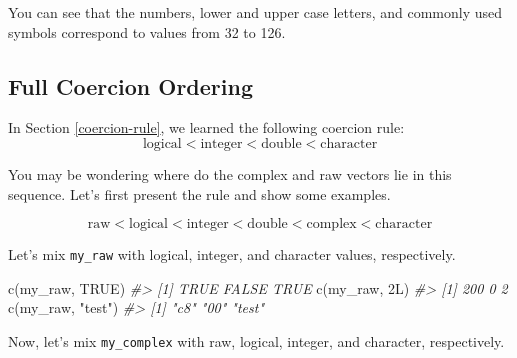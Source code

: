 \documentclass[
]{book}
\newenvironment{Shaded}{\begin{snugshade}}{\end{snugshade}}
\newcommand{\CommentTok}[1]{\textcolor[rgb]{0.56,0.35,0.01}{\textit{#1}}}
\newcommand{\ConstantTok}[1]{\textcolor[rgb]{0.00,0.00,0.00}{#1}}
\newcommand{\DecValTok}[1]{\textcolor[rgb]{0.00,0.00,0.81}{#1}}
\newcommand{\FunctionTok}[1]{\textcolor[rgb]{0.00,0.00,0.00}{#1}}
\newcommand{\NormalTok}[1]{#1}
\newcommand{\SpecialCharTok}[1]{\textcolor[rgb]{0.00,0.00,0.00}{#1}}
\newcommand{\StringTok}[1]{\textcolor[rgb]{0.31,0.60,0.02}{#1}}
\begin{document}
\begin{Shaded}
\end{Shaded}

You can see that the numbers, lower and upper case letters, and commonly used symbols correspond to values from 32 to 126.

\hypertarget{full-coercion-ordering}{%
\subsection{Full Coercion Ordering}\label{full-coercion-ordering}}

In Section \ref{coercion-rule}, we learned the following coercion rule:
\[\mbox{logical} < \mbox{integer} < \mbox{double} < \mbox{character}\]

You may be wondering where do the complex and raw vectors lie in this sequence. Let's first present the rule and show some examples.

\[\mbox{raw} < \mbox{logical} < \mbox{integer} < 
\mbox{double} < \mbox{complex} < \mbox{character}\]

Let's mix \texttt{my\_raw} with logical, integer, and character values, respectively.

\begin{Shaded}
\begin{Highlighting}[]
\FunctionTok{c}\NormalTok{(my\_raw, }\ConstantTok{TRUE}\NormalTok{)}
\CommentTok{\#\textgreater{} [1]  TRUE FALSE  TRUE}
\FunctionTok{c}\NormalTok{(my\_raw, 2L)}
\CommentTok{\#\textgreater{} [1] 200   0   2}
\FunctionTok{c}\NormalTok{(my\_raw, }\StringTok{"test"}\NormalTok{)}
\CommentTok{\#\textgreater{} [1] "c8"   "00"   "test"}
\end{Highlighting}
\end{Shaded}

Now, let's mix \texttt{my\_complex} with raw, logical, integer, and character, respectively.
\end{document}
